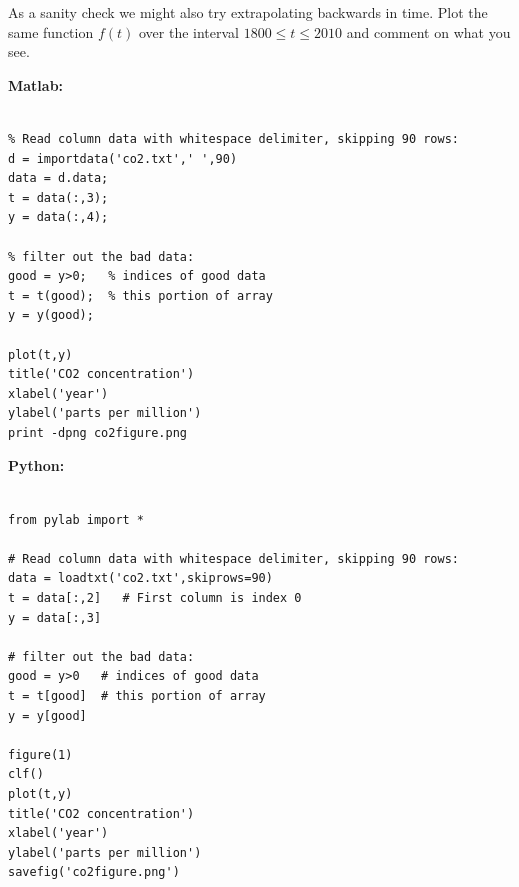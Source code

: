\documentclass[10pt]{article}
\begin{document}
As a sanity check we might also try extrapolating backwards in time.  Plot
the same function $f(t)$ over the interval $1800 \leq t \leq 2010$ and
comment on what you see.  

\newpage
{\large\bf Matlab:}

\begin{verbatim}

% Read column data with whitespace delimiter, skipping 90 rows:
d = importdata('co2.txt',' ',90)
data = d.data;
t = data(:,3);
y = data(:,4);

% filter out the bad data:
good = y>0;   % indices of good data
t = t(good);  % this portion of array
y = y(good);

plot(t,y)
title('CO2 concentration')
xlabel('year')
ylabel('parts per million')
print -dpng co2figure.png

\end{verbatim} 

{\large\bf Python:}

\begin{verbatim} 

from pylab import *

# Read column data with whitespace delimiter, skipping 90 rows:
data = loadtxt('co2.txt',skiprows=90)
t = data[:,2]   # First column is index 0
y = data[:,3]

# filter out the bad data:
good = y>0   # indices of good data
t = t[good]  # this portion of array
y = y[good]

figure(1)
clf()
plot(t,y)
title('CO2 concentration')
xlabel('year')
ylabel('parts per million')
savefig('co2figure.png')

\end{verbatim} 
    




\end{document}
